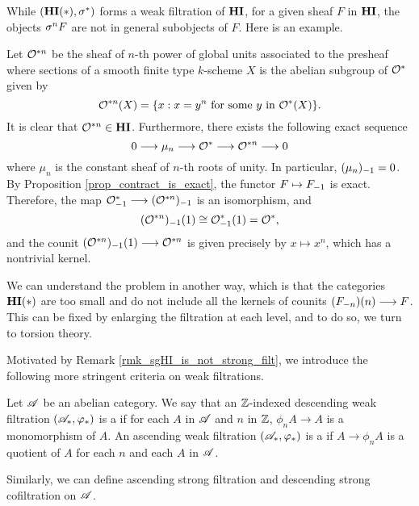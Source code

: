 \begin{ex}\label{rmk_sgHI_is_not_strong_filt}
While $(\HI(*), \sgHI{*})$ forms a weak filtration of $\HI$, for
a given sheaf $F$ in $\HI$, the objects $\sgHI{n} F$ are not 
in general subobjects of $F$. Here is an example.

Let $\Oxn$ be the sheaf of $n$-th power of global units 
associated to the presheaf where sections of a smooth finite type 
$k$-scheme $X$ is the abelian subgroup of $\Ox$ given by 
\[
\Oxn(X) = \{x : x=y^n\textrm{ for some }y \textrm{ in } \Ox(X)\}.
\]
It is clear that $\Oxn \in \HI$. Furthermore, there exists the 
following exact sequence 
\[
0 \to \mu_n \to \Ox \to \Oxn \to 0
\]
where $\mu_n$ is the constant sheaf of $n$-th roots of unity.
In particular, $\RHI{(\mu_n)} = 0$. By Proposition 
\ref{prop_contract_is_exact}, the functor $F \mapsto \RHI{F}$ is
exact. Therefore, the map $\RHI{\Ox} \to \RHI{(\Oxn)}$ is an
isomorphism, and
\[
\LHI{\RHI{(\Oxn)}} \cong \LHI{\RHI{\Ox}} = \Ox,
\]
and the counit $\LHI{\RHI{(\Oxn)}} \to \Oxn$ is given precisely by
$x \mapsto x^n$, which has a nontrivial kernel.

We can understand the problem in another way, which is that the 
categories $\HI(*)$ are too small and do not include all
the kernels of counits $\LHI[n]{(\RHI[n]{F})} \to F$. This can be 
fixed by enlarging the filtration at each level, and to do so, we 
turn to torsion theory.
\end{ex}

Motivated by Remark \ref{rmk_sgHI_is_not_strong_filt}, we 
introduce the following more stringent criteria on weak
filtrations.

\begin{defn}\label{def_strong_filtration}
  Let $\Cat{A}$ be an abelian category. We say that an $\Z$-indexed
  descending weak filtration $(\Cat{A}_*, \phi_*)$ is a  if for each $A$ in $\Cat{A}$ and $n$ in $\Z$, $\phi_n
  A \to A$ is a monomorphism of $A$. An ascending weak filtration
  $(\Cat{A}_*, \phi_*)$ is a  if $A \to
  \phi_n A$ is a quotient of $A$ for each $n$ and each $A$ in
  $\Cat{A}$.

  Similarly, we can define ascending strong filtration and descending
  strong cofiltration on $\Cat{A}$.
\end{defn}

